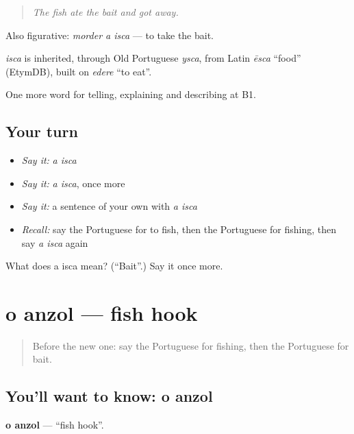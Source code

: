 \begin{quote}
\emph{The fish ate the bait and got away.}
\end{quote}

Also figurative: \emph{morder a isca} — to take the bait.

\begin{cousinweb}
\emph{isca} is inherited, through Old Portuguese \emph{ysca}, from Latin \emph{ēsca} \textquotedblleft{}food\textquotedblright{} (EtymDB), built on \emph{edere} \textquotedblleft{}to eat\textquotedblright{}.
\end{cousinweb}

\begin{grammarlens}[title={What you've built}]
One more word for telling, explaining and describing at B1.
\end{grammarlens}

\subsection*{Your turn}
\begin{itemize}
\raggedright
  \item \emph{Say it:} \emph{a isca}
  \item \emph{Say it:} \emph{a isca}, once more
  \item \emph{Say it:} a sentence of your own with \emph{a isca}
  \item \emph{Recall:} say the Portuguese for to fish, then the Portuguese for fishing, then say \emph{a isca} again
\end{itemize}

\begin{tcolorbox}[breakable,colback=teal!4,colframe=teal!35!black,title={Before you move on}]
What does a isca mean? (\textquotedblleft{}Bait\textquotedblright{}.) Say it once more.
\end{tcolorbox}
\section[o anzol]{o anzol — fish hook}

\label{lesson:PT-C502-anzol}



\begin{quote}
Before the new one: say the Portuguese for fishing, then the Portuguese for bait.
\end{quote}

\subsection*{You'll want to know: o anzol}
\textbf{o anzol} — \textquotedblleft{}fish hook\textquotedblright{}.

